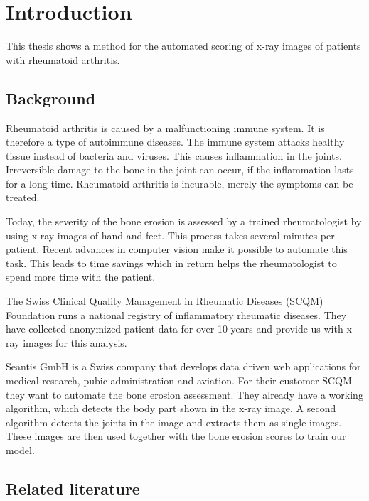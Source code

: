\documentclass[12pt]{article}
\begin{document}
\section{Introduction}

This thesis shows a method for the automated scoring of x-ray images of patients with rheumatoid arthritis. 

\subsection{Background}

Rheumatoid arthritis is caused by a malfunctioning immune system. It is therefore a type of autoimmune diseases. The immune system attacks healthy tissue instead of bacteria and viruses. This causes inflammation in the joints. Irreversible damage to the bone in the joint can occur, if the inflammation lasts for a long time. \cite{rheuma} Rheumatoid arthritis is incurable, merely the symptoms can be treated.

Today, the severity of the bone erosion is assessed by a trained rheumatologist by using x-ray images of hand and feet. This process takes several minutes per patient. Recent advances in computer vision make it possible to automate this task. This leads to time savings which in return helps the rheumatologist to spend more time with the patient.

The Swiss Clinical Quality Management in Rheumatic Diseases (SCQM) Foundation runs a national registry of inflammatory rheumatic diseases. \cite{scqm_about} They have collected anonymized patient data for over 10 years and provide us with x-ray images for this analysis.

Seantis GmbH is a Swiss company that develops data driven web applications for medical research, pubic administration and aviation. \cite{seantis_about} For their customer SCQM they want to automate the bone erosion assessment. They already have a working algorithm, which detects the body part shown in the x-ray image. A second algorithm detects the joints in the image and extracts them as single images. These images are then used together with the bone erosion scores to train our model.


\subsection{Related literature}
\end{document}
